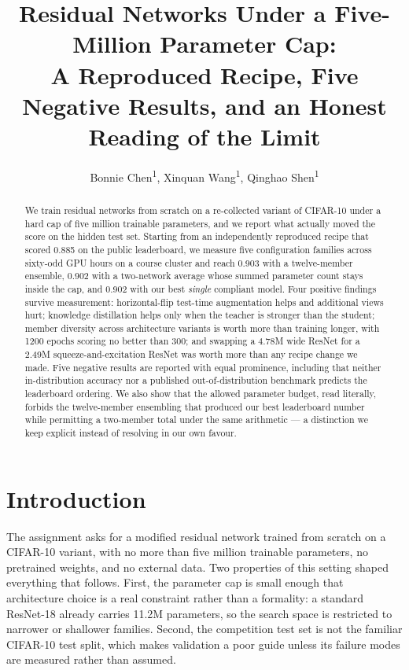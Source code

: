 \documentclass[letterpaper]{article} %
\title{Residual Networks Under a Five-Million Parameter Cap:\\
A Reproduced Recipe, Five Negative Results, and an Honest Reading of the Limit}
\author{
    Bonnie Chen\textsuperscript{\rm 1},
    Xinquan Wang\textsuperscript{\rm 1},
    Qinghao Shen\textsuperscript{\rm 1}
}
\begin{document}
\maketitle

\begin{abstract}
We train residual networks from scratch on a re-collected variant of CIFAR-10 under a hard
cap of five million trainable parameters, and we report what actually moved the score on the
hidden test set. Starting from an independently reproduced recipe that scored 0.885 on the
public leaderboard, we measure five configuration families across sixty-odd GPU hours on a
course cluster and reach 0.903 with a twelve-member ensemble, 0.902 with a two-network average
whose summed parameter count stays inside the cap, and 0.902 with our best \emph{single}
compliant model. Four positive findings survive measurement: horizontal-flip test-time
augmentation helps and additional views hurt; knowledge distillation helps only when the
teacher is stronger than the student; member diversity across architecture variants is worth
more than training longer, with 1200 epochs scoring no better than 300; and swapping a 4.78M
wide ResNet for a 2.49M squeeze-and-excitation ResNet was worth more than any recipe change we
made. Five negative results are reported with
equal prominence, including that neither in-distribution accuracy nor a published
out-of-distribution benchmark predicts the leaderboard ordering. We also show that the
allowed parameter budget, read literally, forbids the twelve-member ensembling that produced
our best leaderboard number while permitting a two-member total under the same arithmetic --- a
distinction we keep explicit instead of resolving in our own favour.
\end{abstract}

\begin{links}
\end{links}

\section{Introduction}

The assignment asks for a modified residual network trained from scratch on a CIFAR-10
variant, with no more than five million trainable parameters, no pretrained weights, and no
external data. Two properties of this setting shaped everything that follows. First, the
parameter cap is small enough that architecture choice is a real constraint rather than a
formality: a standard ResNet-18 already carries 11.2M parameters, so the search space is
restricted to narrower or shallower families. Second, the competition test set is not the
familiar CIFAR-10 test split, which makes validation a poor guide unless its failure modes are
measured rather than assumed.
\end{document}
